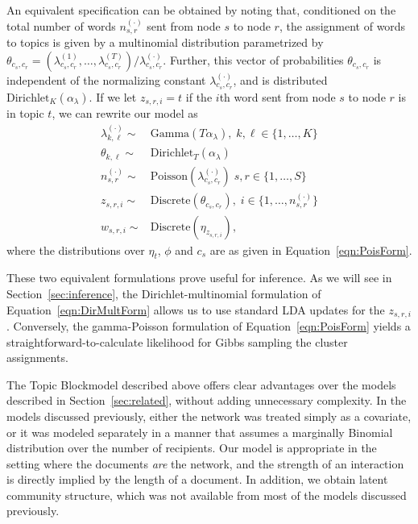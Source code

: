     An equivalent specification can be obtained by noting that, conditioned on the total number of words $n_{s,r}^{(\cdot)}$ sent from node $s$ to node $r$, the assignment of words to topics is given by a multinomial distribution parametrized by
    $ \theta_{c_s,c_r} = \left(\lambda_{c_s,c_r}^{(1)},\dots,  \lambda_{c_s,c_r}^{(T)}\right)/\lambda_{c_s,c_r}^{(\cdot)}$.
    Further, this vector of probabilities $\theta_{c_s,c_r}$ is independent of the normalizing constant $\lambda_{c_s,c_r}^{(\cdot)}$, and is distributed $\mbox{Dirichlet}_K(\alpha_\lambda)$. If we let $z_{s,r,i} =t$ if the $i$th word sent from node $s$ to node $r$ is in topic $t$, we can rewrite our model as
    \begin{equation}
      \begin{aligned}
        \lambda^{(\cdot)}_{k,\ell}\sim& \mbox{Gamma}(T\alpha_\lambda),\; k,\ell\in\{1,\dots, K\}\\
        \theta_{k,\ell} \sim& \mbox{Dirichlet}_T(\alpha_\lambda)\\
        n_{s,r}^{(\cdot)}\sim& \mbox{Poisson}(\lambda_{c_s,c_r}^{(\cdot)})\; s,r\in\{1,\dots, S\}\\
        z_{s,r,i} \sim& \mbox{Discrete}(\theta_{c_s,c_r}),\; i\in\{1,\dots, n_{s,r}^{(\cdot)}\}\\
        w_{s,r,i} \sim& \mbox{Discrete}(\eta_{z_{s,r,i}}),
      \end{aligned}\label{eqn:DirMultForm}
    \end{equation}
    where the distributions over $\eta_t$, $\phi$ and $c_s$ are as given in Equation~\ref{eqn:PoisForm}.
    
    These two equivalent formulations prove useful for inference. As we will see in Section~\ref{sec:inference}, the Dirichlet-multinomial formulation of Equation~\ref{eqn:DirMultForm} allows us to use standard LDA updates for the $z_{s,r,i}$. Conversely, the gamma-Poisson formulation of Equation~\ref{eqn:PoisForm} yields a straightforward-to-calculate likelihood for Gibbs sampling the cluster assignments. 
    
    The Topic Blockmodel described above offers clear advantages over the models described in Section~\ref{sec:related}, without adding unnecessary complexity. In the models discussed previously, either the network was treated simply as a covariate, or it was modeled separately in a manner that assumes a marginally Binomial distribution over the number of recipients. Our model is appropriate in the setting where the documents \textit{are} the network, and the strength of an interaction is directly implied by the length of a document. In addition, we obtain latent community structure, which was not available from most of the models discussed previously.

